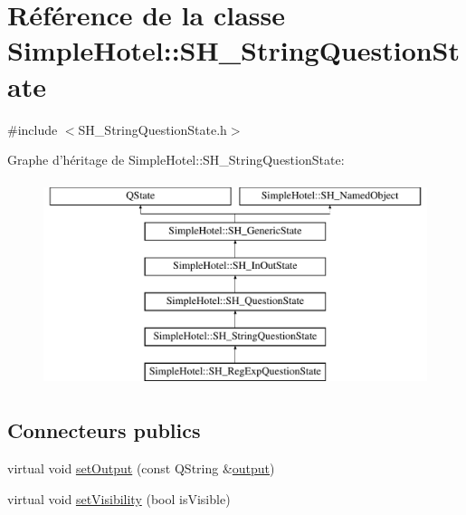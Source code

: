\hypertarget{classSimpleHotel_1_1SH__StringQuestionState}{\section{Référence de la classe Simple\-Hotel\-:\-:S\-H\-\_\-\-String\-Question\-State}
\label{classSimpleHotel_1_1SH__StringQuestionState}
}


{\ttfamily \#include $<$S\-H\-\_\-\-String\-Question\-State.\-h$>$}

Graphe d'héritage de Simple\-Hotel\-:\-:S\-H\-\_\-\-String\-Question\-State\-:\begin{figure}[H]
\begin{center}
\leavevmode
\includegraphics[height=6.000000cm]{classSimpleHotel_1_1SH__StringQuestionState}
\end{center}
\end{figure}
\subsection*{Connecteurs publics}
\begin{DoxyCompactItemize}
\item 
virtual void \hyperlink{classSimpleHotel_1_1SH__InOutState_a5e151d7b01cceb6766b6d83d4a9ac1aa}{set\-Output} (const Q\-String \&\hyperlink{classSimpleHotel_1_1SH__InOutState_a71b15e4d49b9c2aa540500065ceb39da}{output})
\item 
virtual void \hyperlink{classSimpleHotel_1_1SH__InOutState_a2da1edbe247e9b2661c81c9dc2c7ef8d}{set\-Visibility} (bool is\-Visible)
\end{DoxyCompactItemize}
